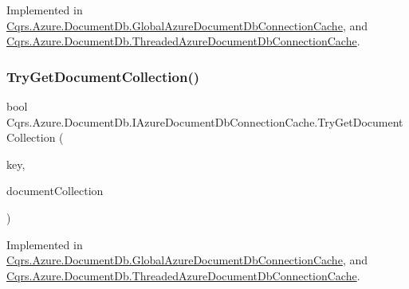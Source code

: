 Implemented in \hyperlink{classCqrs_1_1Azure_1_1DocumentDb_1_1GlobalAzureDocumentDbConnectionCache_afa1518eacc7e71308bfe3ef27631da45}{Cqrs.\+Azure.\+Document\+Db.\+Global\+Azure\+Document\+Db\+Connection\+Cache}, and \hyperlink{classCqrs_1_1Azure_1_1DocumentDb_1_1ThreadedAzureDocumentDbConnectionCache_a00ea55a85c74b84cfc5f2007e3bc9be3}{Cqrs.\+Azure.\+Document\+Db.\+Threaded\+Azure\+Document\+Db\+Connection\+Cache}.

\mbox{\label{interfaceCqrs_1_1Azure_1_1DocumentDb_1_1IAzureDocumentDbConnectionCache_af74bf6c8dc009e0179edc20ef3158f03}} 
\subsubsection{\texorpdfstring{Try\+Get\+Document\+Collection()}{TryGetDocumentCollection()}}
{\footnotesize\ttfamily bool Cqrs.\+Azure.\+Document\+Db.\+I\+Azure\+Document\+Db\+Connection\+Cache.\+Try\+Get\+Document\+Collection (\begin{DoxyParamCaption}\item[{string}]{key,  }\item[{out Document\+Collection}]{document\+Collection }\end{DoxyParamCaption})}



Implemented in \hyperlink{classCqrs_1_1Azure_1_1DocumentDb_1_1GlobalAzureDocumentDbConnectionCache_a9b178e41d62c9ebcfd8936418d5de009}{Cqrs.\+Azure.\+Document\+Db.\+Global\+Azure\+Document\+Db\+Connection\+Cache}, and \hyperlink{classCqrs_1_1Azure_1_1DocumentDb_1_1ThreadedAzureDocumentDbConnectionCache_a0986cecb40fc143751abb4605f507975}{Cqrs.\+Azure.\+Document\+Db.\+Threaded\+Azure\+Document\+Db\+Connection\+Cache}.

